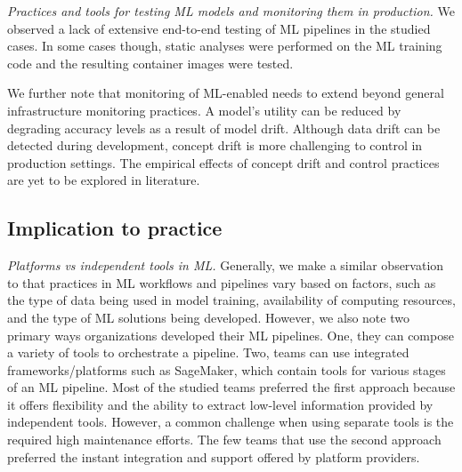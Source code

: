 \textit{Practices and tools for testing \DIFdelbegin {}\DIFdelend ML models and monitoring them in production.} We observed a lack of extensive end-to-end testing of ML pipelines in the studied cases. In some cases though, static analyses were performed on the ML training code and the resulting container images were tested. 

We further note that monitoring of ML-enabled \DIFdelbegin {}\DIFdelend \DIFaddbegin {}\DIFaddend needs to extend beyond \DIFdelbegin {}\DIFdelend general infrastructure monitoring practices. A model's utility can be reduced by degrading accuracy levels as a result of model drift. Although data drift can be detected during \DIFaddbegin {}\DIFaddend development, concept drift is more challenging to control in production settings. The empirical effects of concept drift and control practices are yet to be explored in literature.


\subsection{Implication to practice}
\textit{Platforms vs \DIFdelbegin {}\DIFdelend independent tools in ML.} Generally, we make a similar observation to \cite{Doris2021MLPipelines} that practices in ML workflows and pipelines vary based on factors, such as the type of data being used in model training, availability of computing resources, and the type of ML solutions being developed. However, we also note two primary ways organizations developed their ML pipelines. One, they can compose a variety of tools to orchestrate a pipeline. Two, teams can use integrated frameworks/platforms such as SageMaker, which contain \DIFdelbegin {}\DIFdelend \DIFaddbegin {}\DIFaddend tools for various stages of an ML pipeline. Most of the studied teams preferred the first approach because it offers flexibility and the ability to extract low-level information provided by independent tools. However, a common challenge when using separate tools is the required high maintenance efforts. The few teams that use the second approach preferred the instant integration and support offered by platform providers.

